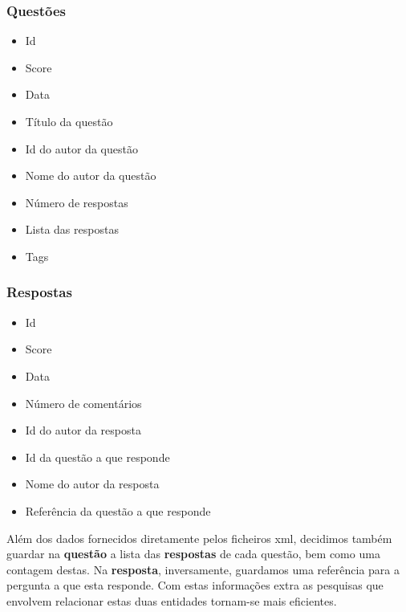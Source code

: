 \documentclass[10pt,a4paper]{article}
\begin{document}
        \subsubsection{Questões}
        \begin{multicols}{2}
        \begin{itemize}
            \item Id
            \item Score
            \item Data
            \item Título da questão
            \item Id do autor da questão
            \item Nome do autor da questão
            \item Número de respostas
            \item Lista das respostas
            \item Tags
        \end{itemize}
        \end{multicols}

        \subsubsection{Respostas}
        \begin{multicols}{2}
        \begin{itemize}
            \item Id
            \item Score
            \item Data
            \item Número de comentários
            \item Id do autor da resposta
            \item Id da questão a que responde
            \item Nome do autor da resposta
            \item Referência da questão a que responde
        \end{itemize}
        \end{multicols}
    Além dos dados fornecidos diretamente pelos ficheiros xml, decidimos também
    guardar na \textbf{questão} a lista das \textbf{respostas} de cada questão,
    bem como uma contagem destas. Na \textbf{resposta}, inversamente, guardamos
    uma referência para a pergunta a que esta responde. Com estas informações
    extra as pesquisas que envolvem relacionar estas duas entidades tornam-se
    mais eficientes.
\end{document}

